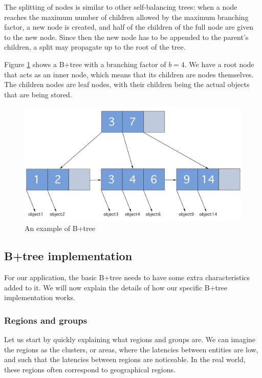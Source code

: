 The splitting of nodes is similar to other self-balancing trees: when a node reaches the maximum number of children allowed by the maximum branching factor, a new node is created, and half of the children of the full node are given to the new node. Since then the new node has to be appended to the parent's children, a split may propagate up to the root of the tree.

Figure \ref{fig:B+tree} shows a B+tree with a branching factor of $b=4$. We have a root node that acts as an inner node, which means that its children are nodes themselves. The children nodes are leaf nodes, with their children being the actual objects that are being stored.

\begin{figure}[!htb]
    \centering
    \includegraphics[width=\textwidth,height=\textheight,keepaspectratio]{img/B+tree.png}
    \caption{ An example of B+tree }
    \label{fig:B+tree}
\end{figure}


\subsection{B+tree implementation}\label{sec:B+tree-implementation}
For our application, the basic B+tree needs to have some extra characteristics added to it. We will now explain the details of how our specific B+tree implementation works.


\subsubsection{Regions and groups}
Let us start by quickly explaining what regions and groups are. We can imagine the regions as the clusters, or areas, where the latencies between entities are low, and such that the latencies between regions are noticeable. In the real world, these regions often correspond to geographical regions.

